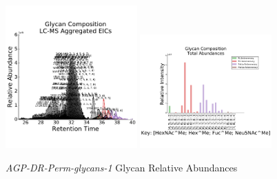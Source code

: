     \begin{figure}[!htbp]
        \centering
        \includegraphics[width=0.45\textwidth,valign=t]{figure/dp_agp_chromatograms.pdf}
        \includegraphics[width=0.45\textwidth,valign=t]{figure/dp_agp_abundances.pdf}
        \caption{\textit{AGP-DR-Perm-glycans-1} Glycan Relative Abundances}
        \label{fig:dp_agp_aggregated_eics}
    \end{figure}


